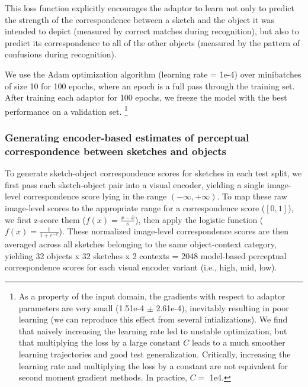 \documentclass[9pt,twocolumn,twoside]{pnas-new}
\begin{document}
{This loss function explicitly encourages the adaptor to learn not only to predict the strength of the correspondence between a sketch and the object it was intended to depict (measured by correct matches during recognition), but also to predict its correspondence to all of the other objects (measured by the pattern of confusions during recognition).

We use the Adam optimization algorithm \cite[]{kingma2014adam} (learning rate = 1e-4) over minibatches of size 10 for 100 epochs, where an epoch is a full pass through the training set. 
After training each adaptor for 100 epochs, we freeze the model with the best performance on a validation set. \footnote{As a property of the input domain, the gradients with respect to adaptor parameters are very small (1.51e-4 $\pm$ 2.61e-4), inevitably resulting in poor learning (we can reproduce this effect from several intializations). We find that naively increasing the learning rate led to unstable optimization, but that multiplying the loss by a large constant $C$ leads to a much smoother learning trajectories and good test generalization. Critically, increasing the learning rate and multiplying the loss by a constant are not equivalent for second moment gradient methods. In practice, $C =$ 1e4.} 

\subsubsection*{Generating encoder-based estimates of perceptual correspondence between sketches and objects}

To generate sketch-object correspondence scores for sketches in each test split, we first pass each sketch-object pair into a visual encoder, yielding a single image-level correspondence score lying in the range $(-\infty,+\infty)$. 
To map these raw image-level scores to the appropriate range for a correspondence score ($[0,1]$), we first z-score them ($f(x) = \frac{x - \bar{x}}{\mathrm{s}}$), then apply the logistic function ($f(x)= \frac{1}{1+e^{-x}}$).
These normalized image-level correspondence scores are then averaged across all sketches belonging to the same object-context category, yielding 32 objects x 32 sketches x 2 contexts  = 2048 model-based perceptual correspondence scores for each visual encoder variant (i.e., high, mid, low).


}
\end{document}
